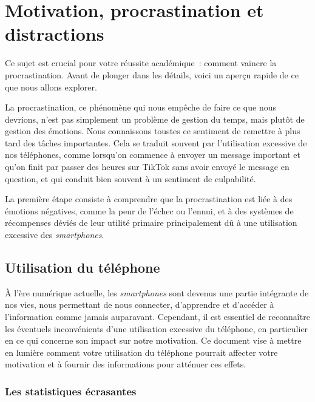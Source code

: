 \documentclass[a4paper, 12pt, garamond]{book}
\begin{document}
\setcounter{chapter}{0}

\chapter{Motivation, procrastination et distractions}




Ce sujet est crucial pour votre réussite académique~: comment vaincre la
procrastination. Avant de plonger dans les détails, voici un aperçu rapide de ce
que nous allons explorer.

La procrastination, ce phénomène qui nous empêche de faire ce que nous devrions,
n'est pas simplement un problème de gestion du temps, mais plutôt de gestion des
émotions. Nous connaissons toustes ce sentiment de remettre à plus tard des
tâches importantes. Cela se traduit souvent par l'utilisation excessive de nos
téléphones, comme lorsqu'on commence à envoyer un message important et qu'on
finit par passer des heures sur TikTok sans avoir envoyé le message en question,
et qui conduit bien souvent à un sentiment de culpabilité.

La première étape consiste à comprendre que la procrastination est liée à des
émotions négatives, comme la peur de l'échec ou l'ennui, et à des systèmes de
récompenses déviés de leur utilité primaire principalement dû à une utilisation
excessive des \textit{smartphones}.

\section{Utilisation du téléphone}

À l'ère numérique actuelle, les \textit{smartphones} sont devenus une partie
intégrante de nos vies, nous permettant de nous connecter, d'apprendre et
d'accéder à l'information comme jamais auparavant. Cependant, il est essentiel
de reconnaître les éventuels inconvénients d'une utilisation excessive du
téléphone, en particulier en ce qui concerne son impact sur notre motivation. Ce
document vise à mettre en lumière comment votre utilisation du téléphone
pourrait affecter votre motivation et à fournir des informations pour atténuer
ces effets.

\subsection{Les statistiques écrasantes}
\end{document}
